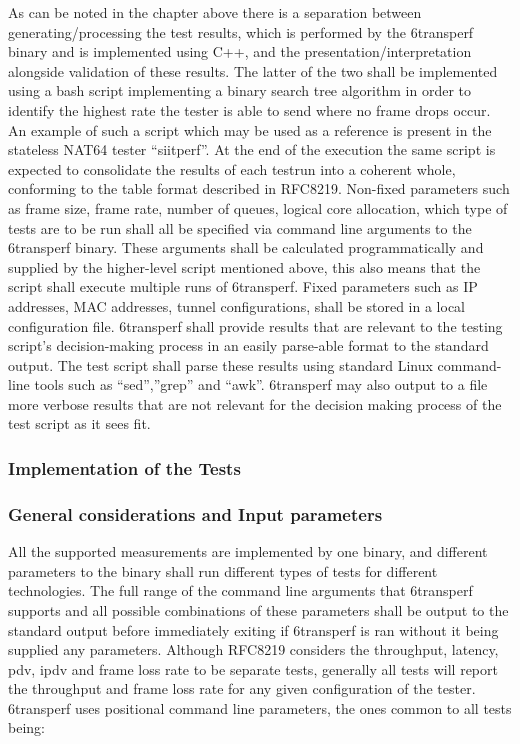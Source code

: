 \documentclass[a4paper,12p]{article}
\begin{document}
As can be noted in the chapter above there is a separation between generating/processing the test results, which is performed by the 6transperf binary and is implemented using C++, and the presentation/interpretation alongside validation of these results. The latter of the two shall be implemented using a bash script implementing a binary search tree algorithm in order to identify the highest rate the tester is able to send where no frame drops occur. An example of such a script which may be used as a reference is present in the stateless NAT64 tester “siitperf”. At the end of the execution the same script is expected to consolidate the results of each testrun into a coherent whole, conforming to the table format described in RFC8219.
Non-fixed parameters such as frame size, frame rate, number of queues, logical core allocation, which type of tests are to be run shall all be specified via command line arguments to the 6transperf binary. These arguments shall be calculated programmatically and supplied by the higher-level script mentioned above, this also means that the script shall execute multiple runs of 6transperf. Fixed parameters such as IP addresses, MAC addresses, tunnel configurations, shall be stored in a local configuration file. 6transperf shall provide results that are relevant to the testing script’s decision-making process in an easily parse-able format to the standard output. The test script shall parse these results using standard Linux command-line tools such as “sed”,”grep” and “awk”. 6transperf may also output to a file more verbose results that are not relevant for the decision making process of the test script as it sees fit.

\subsubsection{Implementation of the Tests}
\subsubsection{General considerations and Input parameters}

All the supported measurements are implemented by one binary, and different parameters to the binary shall run different types of tests for different technologies. The full range of the command line arguments that 6transperf supports and all possible combinations of these parameters shall be output to the standard output before immediately exiting if 6transperf is ran without it being supplied any parameters. Although RFC8219 considers the throughput, latency, pdv, ipdv and frame loss rate to be separate tests, generally all tests will report the throughput and frame loss rate for any given configuration of the tester. 6transperf uses positional command line parameters, the ones common to all tests being:
\end{document}
